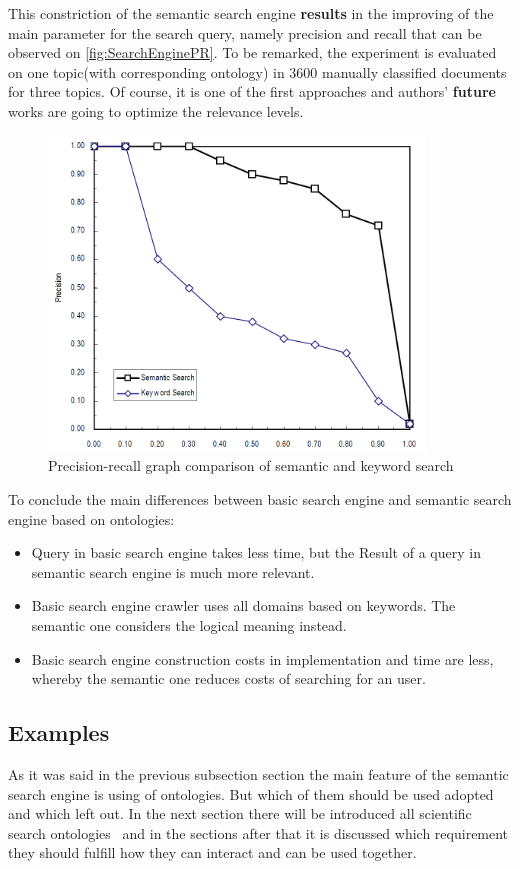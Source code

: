 		This constriction of the semantic search engine \textbf{results} in the improving of the main parameter for the search query, namely precision and recall that can be observed on \autoref{fig:SearchEnginePR}. To be remarked, the experiment is evaluated on one topic(with corresponding ontology) in  3600 manually classified documents for three topics. Of course, it is one of the first approaches and authors' \textbf{future} works are going to optimize the relevance levels.
		\begin{figure}
			\centering
			\includegraphics[width=10cm]{images/SearchEnginePR.PNG}
			\caption{Precision-recall graph comparison of semantic and keyword search\cite[p. 1918]{Fang05}}
			\label{fig:SearchEnginePR}
		\end{figure}
		To conclude the main differences between basic search engine and semantic search engine based on ontologies\cite[p.653]{Gup12}:
			\begin{itemize}
				\item Query in basic search engine takes less time, but the  Result of a query in semantic search engine is much more relevant.
				\item Basic search engine crawler uses all domains based on keywords. The semantic one considers the logical meaning instead. 
				\item Basic search engine construction costs in implementation and time are less, whereby the semantic one reduces costs of searching for an user.   
			\end{itemize} 
		\subsection{Examples}
		As it was said in the previous subsection section the main feature of the semantic search engine is using of ontologies. But which of them should be used adopted and which left out. In the next section there will be introduced all scientific search ontologies \frqq \ and in the sections after that it is discussed which requirement they should fulfill how they can interact and can be used together.
		
